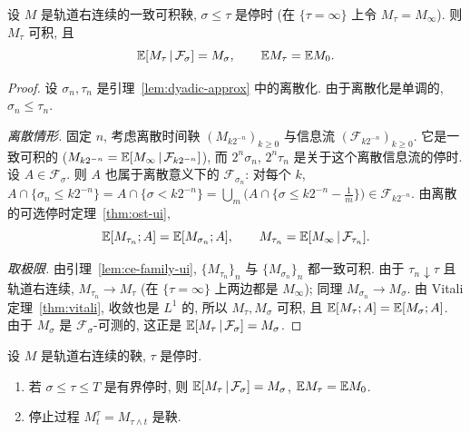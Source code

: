 \begin{theorem}[连续时间可选停时定理]\label{thm:ct-ost}
设 $M$ 是轨道右连续的一致可积鞅, $\sigma\le\tau$ 是停时 (在 $\{\tau=\infty\}$ 上令 $M_\tau=M_\infty$). 则 $M_\tau$ 可积, 且
\[
\mathbb{E}[M_\tau\,|\,\mathcal{F}_\sigma]=M_\sigma,\qquad\mathbb{E} M_\tau=\mathbb{E} M_0.
\]
\end{theorem}

\begin{proof}
设 $\sigma_n,\tau_n$ 是引理~\ref{lem:dyadic-approx} 中的离散化. 由于离散化是单调的, $\sigma_n\le\tau_n$.

\emph{离散情形.} 固定 $n$, 考虑离散时间鞅 $(M_{k2^{-n}})_{k\ge0}$ 与信息流 $(\mathcal{F}_{k2^{-n}})_{k\ge0}$. 它是一致可积的 ($M_{k2^{-n}}=\mathbb{E}[M_\infty\,|\,\mathcal{F}_{k2^{-n}}]$), 而 $2^n\sigma_n$, $2^n\tau_n$ 是关于这个离散信息流的停时. 设 $A\in\mathcal{F}_\sigma$. 则 $A$ 也属于离散意义下的 $\mathcal{F}_{\sigma_n}$: 对每个 $k$,
$A\cap\{\sigma_n\le k2^{-n}\}=A\cap\{\sigma<k2^{-n}\}=\bigcup_m\big(A\cap\{\sigma\le k2^{-n}-\tfrac{1}{m}\}\big)\in\mathcal{F}_{k2^{-n}}$. 由离散的可选停时定理~\ref{thm:ost-ui},
\[
\mathbb{E}[M_{\tau_n};A]=\mathbb{E}[M_{\sigma_n};A],\qquad M_{\tau_n}=\mathbb{E}[M_\infty\,|\,\mathcal{F}_{\tau_n}].
\]

\emph{取极限.} 由引理~\ref{lem:ce-family-ui}, $\{M_{\tau_n}\}_n$ 与 $\{M_{\sigma_n}\}_n$ 都一致可积. 由于 $\tau_n\downarrow\tau$ 且轨道右连续, $M_{\tau_n}\to M_\tau$ (在 $\{\tau=\infty\}$ 上两边都是 $M_\infty$); 同理 $M_{\sigma_n}\to M_\sigma$. 由 Vitali 定理~\ref{thm:vitali}, 收敛也是 $L^1$ 的, 所以 $M_\tau,M_\sigma$ 可积, 且 $\mathbb{E}[M_\tau;A]=\mathbb{E}[M_\sigma;A]$. 由于 $M_\sigma$ 是 $\mathcal{F}_\sigma$-可测的, 这正是 $\mathbb{E}[M_\tau\,|\,\mathcal{F}_\sigma]=M_\sigma$.
\end{proof}

\begin{corollary}\label{cor:ct-ost-bounded}
设 $M$ 是轨道右连续的鞅, $\tau$ 是停时.
\begin{enumerate}
\item 若 $\sigma\le\tau\le T$ 是有界停时, 则 $\mathbb{E}[M_\tau\,|\,\mathcal{F}_\sigma]=M_\sigma$, $\mathbb{E} M_\tau=\mathbb{E} M_0$.
\item 停止过程 $M^\tau_t=M_{\tau\wedge t}$ 是鞅.
\end{enumerate}
\end{corollary}

